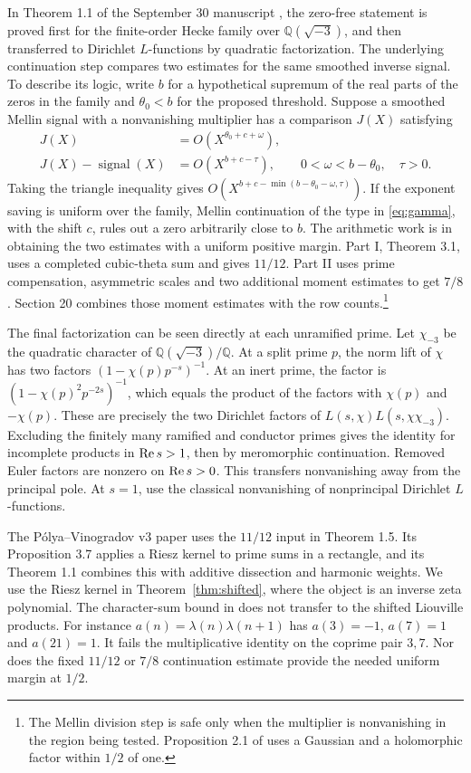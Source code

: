 In Theorem 1.1 of the September 30 manuscript \cite{oai}, the zero-free statement is proved first for the finite-order Hecke family over \(\mathbb Q(\sqrt{-3})\), and then transferred to Dirichlet \(L\)-functions by quadratic factorization. The underlying continuation step compares two estimates for the same smoothed inverse signal. To describe its logic, write \(b\) for a hypothetical supremum of the real parts of the zeros in the family and \(\theta_0<b\) for the proposed threshold. Suppose a smoothed Mellin signal with a nonvanishing multiplier has a comparison \(J(X)\) satisfying
\begin{align*}
 J(X)&=O(X^{\theta_0+c+\omega}),\\
 J(X)-\operatorname{signal}(X)&=O(X^{b+c-\tau}),
 \qquad 0<\omega<b-\theta_0,\quad \tau>0 .
\end{align*}
Taking the triangle inequality gives \(O(X^{b+c-\min(b-\theta_0-\omega,\tau)})\). If the exponent saving is uniform over the family, Mellin continuation of the type in \eqref{eq:gamma}, with the shift \(c\), rules out a zero arbitrarily close to \(b\). The arithmetic work is in obtaining the two estimates with a uniform positive margin. Part I, Theorem 3.1, uses a completed cubic-theta sum and gives \(11/12\). Part II uses prime compensation, asymmetric scales and two additional moment estimates to get \(7/8\). Section 20 combines those moment estimates with the row counts.\footnote{The Mellin division step is safe only when the multiplier is nonvanishing in the region being tested. Proposition 2.1 of \cite{oai} uses a Gaussian and a holomorphic factor within \(1/2\) of one.}

The final factorization can be seen directly at each unramified prime. Let \(\chi_{-3}\) be the quadratic character of \(\mathbb Q(\sqrt{-3})/\mathbb Q\). At a split prime \(p\), the norm lift of \(\chi\) has two factors \((1-\chi(p)p^{-s})^{-1}\). At an inert prime, the factor is \((1-\chi(p)^2p^{-2s})^{-1}\), which equals the product of the factors with \(\chi(p)\) and \(-\chi(p)\). These are precisely the two Dirichlet factors of \(L(s,\chi)L(s,\chi\chi_{-3})\). Excluding the finitely many ramified and conductor primes gives the identity for incomplete products in \(\operatorname{Re} s>1\), then by meromorphic continuation. Removed Euler factors are nonzero on \(\operatorname{Re} s>0\). This transfers nonvanishing away from the principal pole. At \(s=1\), use the classical nonvanishing of nonprincipal Dirichlet \(L\)-functions.

The P\'olya--Vinogradov v3 paper \cite{pv} uses the \(11/12\) input in Theorem 1.5. Its Proposition 3.7 applies a Riesz kernel to prime sums in a rectangle, and its Theorem 1.1 combines this with additive dissection and harmonic weights. We use the Riesz kernel in Theorem~\ref{thm:shifted}, where the object is an inverse zeta polynomial. The character-sum bound in \cite{pv} does not transfer to the shifted Liouville products. For instance \(a(n)=\lambda(n)\lambda(n+1)\) has \(a(3)=-1\), \(a(7)=1\) and \(a(21)=1\). It fails the multiplicative identity on the coprime pair \(3,7\). Nor does the fixed \(11/12\) or \(7/8\) continuation estimate provide the needed uniform margin at \(1/2\).
